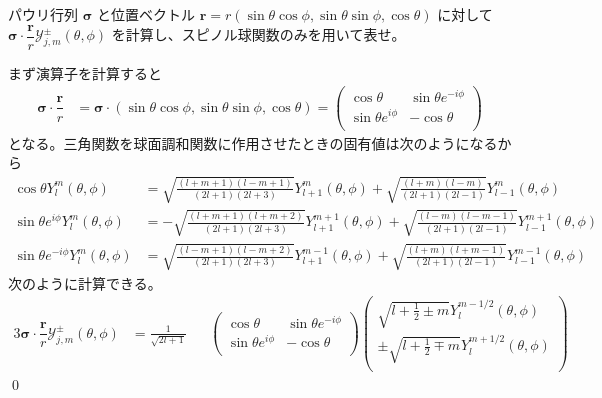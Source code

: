 \documentclass[uplatex,dvipdfmx,a4paper,11pt]{jlreq}
\makeatletter
\theoremstyle{definition}
\renewenvironment{proof}[1][\proofname]{\par
  \normalfont
  \topsep6\p@\@plus6\p@ \trivlist
  \item[\hskip\labelsep{\bfseries #1}\@addpunct{\bfseries}]\ignorespaces\quad\par
}{%
  \qed\endtrivlist\@endpefalse
}
\renewcommand\proofname{証明}
\newcommand{\rr}{\bm{r}}
\numberwithin{equation}{section}
\makeatother
\begin{document}
\begin{problem}
パウリ行列 $\bm{\sigma}$ と位置ベクトル $\rr = r(\sin\theta\cos\phi, \sin\theta\sin\phi, \cos\theta)$ に対して $\bm{\sigma}\cdot\dfrac{\rr}{r}\mathcal{Y}_{j, m}^\pm(\theta, \phi)$ を計算し、スピノル球関数のみを用いて表せ。
\end{problem}
\begin{proof}
  まず演算子を計算すると
  \begin{align}
    \bm{\sigma}\cdot\dfrac{\rr}{r} & = \bm{\sigma}\cdot (\sin\theta\cos\phi, \sin\theta\sin\phi, \cos\theta) =
    \begin{pmatrix}
      \cos\theta           & \sin\theta e^{-i\phi} \\
      \sin\theta e^{i\phi} & -\cos\theta           \\
    \end{pmatrix}
  \end{align}
  となる。三角関数を球面調和関数に作用させたときの固有値は次のようになるから
  \begin{align}
    \cos\theta Y_{l}^m(\theta, \phi)            & = \sqrt{\frac{(l + m + 1)(l - m + 1)}{(2l + 1)(2l + 3)}}Y_{l+1}^m(\theta, \phi) + \sqrt{\frac{(l + m)(l - m)}{(2l + 1)(2l - 1)}}Y_{l-1}^m(\theta, \phi)              \\
    \sin\theta e^{i\phi} Y_{l}^m(\theta, \phi)  & = -\sqrt{\frac{(l + m + 1)(l + m + 2)}{(2l + 1)(2l + 3)}}Y_{l+1}^{m+1}(\theta, \phi) + \sqrt{\frac{(l - m)(l - m - 1)}{(2l + 1)(2l - 1)}}Y_{l-1}^{m+1}(\theta, \phi) \\
    \sin\theta e^{-i\phi} Y_{l}^m(\theta, \phi) & = \sqrt{\frac{(l - m + 1)(l - m + 2)}{(2l + 1)(2l + 3)}}Y_{l+1}^{m-1}(\theta, \phi) + \sqrt{\frac{(l + m)(l + m - 1)}{(2l + 1)(2l - 1)}}Y_{l-1}^{m-1}(\theta, \phi)
  \end{align}
  次のように計算できる。
  \begin{alignat}{3}
    \bm{\sigma}\cdot\dfrac{\rr}{r}\mathcal{Y}_{j, m}^\pm(\theta, \phi) & = \frac{1}{\sqrt{2l + 1}}       &  &
    \begin{pmatrix}
      \cos\theta           & \sin\theta e^{-i\phi} \\
      \sin\theta e^{i\phi} & -\cos\theta           \\
    \end{pmatrix}
    \begin{pmatrix}
      \sqrt{l + \frac{1}{2} \pm m}Y_l^{m - 1/2}(\theta, \phi)    \\
      \pm\sqrt{l + \frac{1}{2} \mp m}Y_l^{m + 1/2}(\theta, \phi) \\

\end{pmatrix}
\end{alignat}
\end{proof}
\end{document}
